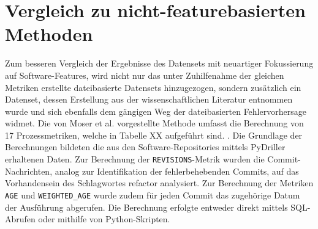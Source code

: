 \section{Vergleich zu nicht-featurebasierten Methoden}

Zum besseren Vergleich der Ergebnisse des Datensets mit neuartiger Fokussierung auf Software-Features, wird nicht nur das unter Zuhilfenahme der gleichen Metriken erstellte dateibasierte Datensets hinzugezogen, sondern zusätzlich ein Datenset, dessen Erstellung aus der wissenschaftlichen Literatur entnommen wurde und sich ebenfalls dem gängigen Weg der dateibasierten Fehlervorhersage widmet. Die von Moser et al. vorgestellte Methode umfasst die Berechnung von 17 Prozessmetriken, welche in Tabelle XX aufgeführt sind. \cite{Moser2008}. Die Grundlage der Berechnungen bildeten die aus den Software-Repositories mittels PyDriller erhaltenen Daten. Zur Berechnung der \texttt{REVISIONS}-Metrik wurden die Commit-Nachrichten, analog zur Identifikation der fehlerbehebenden Commits, auf das Vorhandensein des Schlagwortes \glqq refactor\grqq{} analysiert. Zur Berechnung der Metriken \texttt{AGE} und \texttt{WEIGHTED\_AGE} wurde zudem für jeden Commit das zugehörige Datum der Ausführung abgerufen. Die Berechnung erfolgte entweder direkt mittels SQL-Abrufen oder mithilfe von Python-Skripten. 


